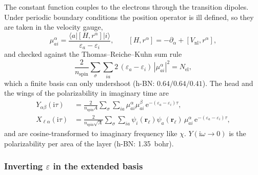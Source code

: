 \documentclass[%
 reprint,
superscriptaddress,
 amsmath,amssymb,
 aps,
prb,
]{revtex4-2}
\newcommand{\br}{\mathbf{r}}
\newcommand{\ii}{\mathrm{i}}
\newcommand{\ee}{\mathrm{e}}
\begin{document}
The constant function couples to the electrons through the transition dipoles. Under periodic
boundary conditions the position operator is ill defined, so they are taken in the velocity
gauge,
\begin{equation}
  \mu^\alpha_{ai} = \frac{\langle a|[H,r^\alpha]|i\rangle}{\varepsilon_a-\varepsilon_i},\qquad
  [H,r^\alpha] = -\partial_\alpha + [V_\mathrm{nl},r^\alpha],
  \label{eq:dipole}
\end{equation}
and checked against the Thomas--Reiche--Kuhn sum rule
\begin{equation}
  \frac{2}{n_\mathrm{spin}}\sum_{\sigma}\sum_{ia}2\,(\varepsilon_a-\varepsilon_i)\,|\mu^\alpha_{ai}|^2 = N_\mathrm{el},
  \label{eq:TRK}
\end{equation}
which a finite basis can only undershoot (h-BN: $0.64/0.64/0.41$). The head and the wings of
the polarizability in imaginary time are
\begin{align}
  Y_{\alpha\beta}(\ii\tau) &= \frac{2}{n_\mathrm{spin}A}\sum_\sigma\sum_{ia}\mu^\alpha_{ai}\mu^\beta_{ai}\,\ee^{-(\varepsilon_a-\varepsilon_i)\tau},
  \label{eq:Y}\\
  X_{\ell\alpha}(\ii\tau) &= \frac{2}{n_\mathrm{spin}\sqrt A}\sum_\sigma\sum_{ia}\psi_i(\br_\ell)\psi_a(\br_\ell)\,\mu^\alpha_{ai}\,\ee^{-(\varepsilon_a-\varepsilon_i)\tau},
  \label{eq:X}
\end{align}
and are cosine-transformed to imaginary frequency like $\chi$. $Y(\ii\omega\to0)$ is the
polarizability per area of the layer (h-BN: 1.35~bohr).

\subsubsection{Inverting $\varepsilon$ in the extended basis}
\label{sec:blockinv}
\end{document}
